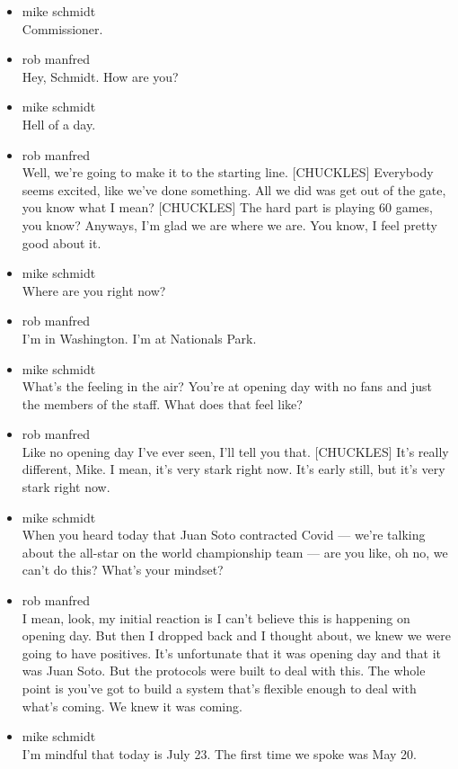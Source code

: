 \begin{itemize}
\item
  mike schmidt\\
  Commissioner.
\item
  rob manfred\\
  Hey, Schmidt. How are you?
\item
  mike schmidt\\
  Hell of a day.
\item
  rob manfred\\
  Well, we're going to make it to the starting line. {[}CHUCKLES{]}
  Everybody seems excited, like we've done something. All we did was get
  out of the gate, you know what I mean? {[}CHUCKLES{]} The hard part is
  playing 60 games, you know? Anyways, I'm glad we are where we are. You
  know, I feel pretty good about it.
\item
  mike schmidt\\
  Where are you right now?
\item
  rob manfred\\
  I'm in Washington. I'm at Nationals Park.
\item
  mike schmidt\\
  What's the feeling in the air? You're at opening day with no fans and
  just the members of the staff. What does that feel like?
\item
  rob manfred\\
  Like no opening day I've ever seen, I'll tell you that. {[}CHUCKLES{]}
  It's really different, Mike. I mean, it's very stark right now. It's
  early still, but it's very stark right now.
\item
  mike schmidt\\
  When you heard today that Juan Soto contracted Covid --- we're talking
  about the all-star on the world championship team --- are you like, oh
  no, we can't do this? What's your mindset?
\item
  rob manfred\\
  I mean, look, my initial reaction is I can't believe this is happening
  on opening day. But then I dropped back and I thought about, we knew
  we were going to have positives. It's unfortunate that it was opening
  day and that it was Juan Soto. But the protocols were built to deal
  with this. The whole point is you've got to build a system that's
  flexible enough to deal with what's coming. We knew it was coming.
\item
  mike schmidt\\
  I'm mindful that today is July 23. The first time we spoke was May 20.

\end{itemize}
